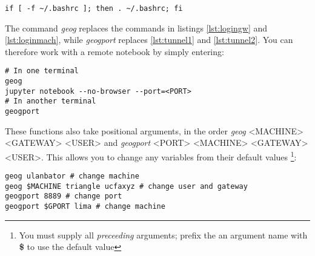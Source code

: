 \documentclass[a4paper]{article}
\begin{document}
\begin{lstlisting}[caption={Source .bashrc on startup}, label={lst:srcbashrc}]
if [ -f ~/.bashrc ]; then . ~/.bashrc; fi
\end{lstlisting}

The command \emph{geog} replaces the commands in listings \ref{lst:logingw} and \ref{lst:loginmach}, while \emph{geogport} replaces \ref{lst:tunnel1} and \ref{lst:tunnel2}.
You can therefore work with a remote notebook by simply entering:
\begin{lstlisting}[caption={Set up and tunnel to remote Notebook server}, label={lst:usegfuncs}]
# In one terminal
geog
jupyter notebook --no-browser --port=<PORT>
# In another terminal
geogport
\end{lstlisting}

These functions also take positional arguments, in the order \emph{geog} \textless{}MACHINE\textgreater{} \textless{}GATEWAY\textgreater{} \textless{}USER\textgreater{} and \emph{geogport} \textless{}PORT\textgreater{} \textless{}MACHINE\textgreater{} \textless{}GATEWAY\textgreater{} \textless{}USER\textgreater{}.
This allows you to change any variables from their default values \footnote{You must supply all \emph{preceeding} arguments; prefix the an argument name with \textbf{\$} to use the default value}:

\begin{lstlisting}[caption={Examples of arguments to geography login/tunnel functions}, label={lst:gfuncsargseg}]
geog ulanbator # change machine
geog $MACHINE triangle ucfaxyz # change user and gateway
geogport 8889 # change port
geogport $GPORT lima # change machine
\end{lstlisting}
\end{document}
